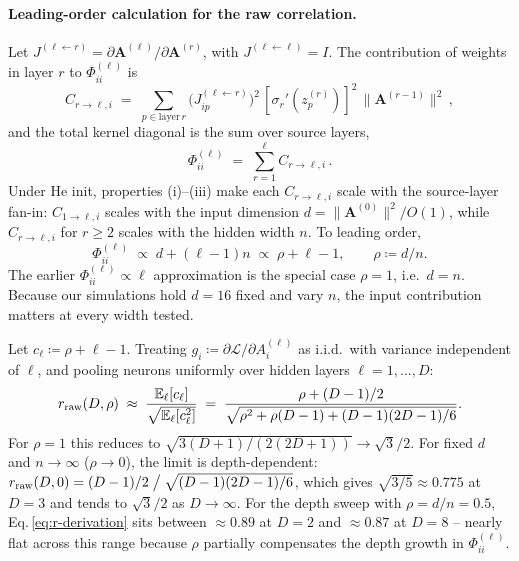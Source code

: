 \documentclass[10pt]{article}
\newcommand{\vA}{\mathbf{A}}
\newcommand{\loss}{\mathcal{L}}
\begin{document}
\paragraph{Leading-order calculation for the raw correlation.}
Let $J^{(\ell\leftarrow r)} = \partial\vA^{(\ell)}/\partial\vA^{(r)}$, with $J^{(\ell\leftarrow\ell)} = I$.  The contribution of weights in layer $r$ to $\Phi^{(\ell)}_{ii}$ is
\[
  C_{r\to\ell,i}
  \;=\;
  \sum_{p\in\text{layer}\,r}
  \bigl(J^{(\ell\leftarrow r)}_{ip}\bigr)^2\,
  [\sigma_r'(z_p^{(r)})]^2\,
  \lVert\vA^{(r-1)}\rVert^2\,,
\]
and the total kernel diagonal is the sum over source layers,
\begin{equation}\label{eq:phi-ii-sum}
  \Phi^{(\ell)}_{ii}\;=\;\sum_{r=1}^{\ell} C_{r\to\ell,i}\,.
\end{equation}
Under He init, properties (i)--(iii) make each $C_{r\to\ell,i}$ scale with the source-layer fan-in: $C_{1\to\ell,i}$ scales with the input dimension $d=\lVert\vA^{(0)}\rVert^2/O(1)$, while $C_{r\to\ell,i}$ for $r\ge 2$ scales with the hidden width $n$.  To leading order,
\begin{equation}\label{eq:phi-ii-scaling}
  \Phi^{(\ell)}_{ii}\;\propto\;d + (\ell-1)n\;\propto\;\rho + \ell - 1,
  \qquad \rho\coloneqq d/n.
\end{equation}
The earlier $\Phi^{(\ell)}_{ii}\propto\ell$ approximation is the special case $\rho=1$, i.e.\ $d=n$.  Because our simulations hold $d=16$ fixed and vary $n$, the input contribution matters at every width tested.

Let $c_\ell\coloneqq\rho+\ell-1$.  Treating $g_i\coloneqq\partial\loss/\partial A_i^{(\ell)}$ as i.i.d.\ with variance independent of $\ell$, and pooling neurons uniformly over hidden layers $\ell=1,\dots,D$:
\begin{equation}\label{eq:r-derivation}
  r_{\rm raw}(D,\rho)
  \;\approx\;
  \frac{\mathbb{E}_\ell[c_\ell]}{\sqrt{\mathbb{E}_\ell[c_\ell^2]}}
  \;=\;
  \frac{\rho + (D-1)/2}{\sqrt{\rho^2 + \rho(D-1) + (D-1)(2D-1)/6}}.
\end{equation}
For $\rho=1$ this reduces to $\sqrt{3(D+1)/(2(2D+1))}\to\sqrt{3}/2$.  For fixed $d$ and $n\to\infty$ ($\rho\to 0$), the limit is depth-dependent: $r_{\rm raw}(D,0) = (D-1)/2\bigm/\sqrt{(D-1)(2D-1)/6}$, which gives $\sqrt{3/5}\approx 0.775$ at $D=3$ and tends to $\sqrt{3}/2$ as $D\to\infty$.  For the depth sweep with $\rho=d/n=0.5$, Eq.\,\ref{eq:r-derivation} sits between $\approx 0.89$ at $D=2$ and $\approx 0.87$ at $D=8$ -- nearly flat across this range because $\rho$ partially compensates the depth growth in $\Phi^{(\ell)}_{ii}$.
\end{document}
